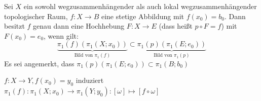 \documentclass[a4paper,10pt]{scrartcl}
\begin{document}
\begin{st}[Hochhebungssatz] \label{thm2:3.11}
 Sei $X$ ein sowohl wegzusammenhängender als auch lokal wegzusammenhängender topologischer Raum, $f:X \to B$ eine stetige Abbildung mit $f(x_0)=b_0$. Dann besitzt $f$ genau dann eine Hochhebung $F: X\to E$ (dass heißt $p\circ F=f$) mit $F(x_0)=e_0$, wenn gilt:
\[
 \underbrace{\pi_1(f) (\pi_1(X;x_0))}_{\text{Bild von $\pi_1(f)$}} \subset \underbrace{\pi_1(p) (\pi_1(E;e_0))}_{\text{Bild von $\pi_1(p)$}}
\]
Es sei angemerkt, dass $\pi_1(p) (\pi_1(E;e_0))\subset \pi_1(B; b_0)$ 
\end{st}

\begin{note*}
 $f:X\to Y, f(x_0)=y_0$ induziert  $\pi_1(f):\pi_1(X;x_0)\to \pi_1(Y;y_0): [\omega]\mapsto [f\circ \omega]$\\
\begin{figure}[H]
\centering
 \caption{}
\end{figure}
\setcounter{figure}{84} %
\end{note*}
\end{document}
